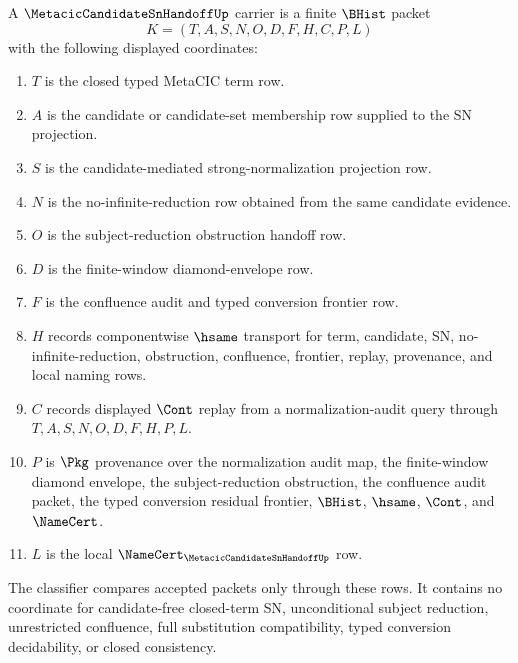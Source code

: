 \begin{definition}
\label{def:metacic-candidate-sn-handoff-carrier}
A $\MetacicCandidateSnHandoffUp$ carrier is a finite $\BHist$ packet
$$
K=(T,A,S,N,O,D,F,H,C,P,L)
$$
with the following displayed coordinates:
\begin{enumerate}
\item $T$ is the closed typed MetaCIC term row.
\item $A$ is the candidate or candidate-set membership row supplied to the SN projection.
\item $S$ is the candidate-mediated strong-normalization projection row.
\item $N$ is the no-infinite-reduction row obtained from the same candidate evidence.
\item $O$ is the subject-reduction obstruction handoff row.
\item $D$ is the finite-window diamond-envelope row.
\item $F$ is the confluence audit and typed conversion frontier row.
\item $H$ records componentwise $\hsame$ transport for term, candidate, SN, no-infinite-reduction, obstruction, confluence, frontier, replay, provenance, and local naming rows.
\item $C$ records displayed $\Cont$ replay from a normalization-audit query through $T,A,S,N,O,D,F,H,P,L$.
\item $P$ is $\Pkg$ provenance over the normalization audit map, the finite-window diamond envelope, the subject-reduction obstruction, the confluence audit packet, the typed conversion residual frontier, $\BHist$, $\hsame$, $\Cont$, and $\NameCert$.
\item $L$ is the local $\NameCert_{\MetacicCandidateSnHandoffUp}$ row.
\end{enumerate}
The classifier compares accepted packets only through these rows. It contains no coordinate for candidate-free closed-term SN, unconditional subject reduction, unrestricted confluence, full substitution compatibility, typed conversion decidability, or closed consistency.
\end{definition}

